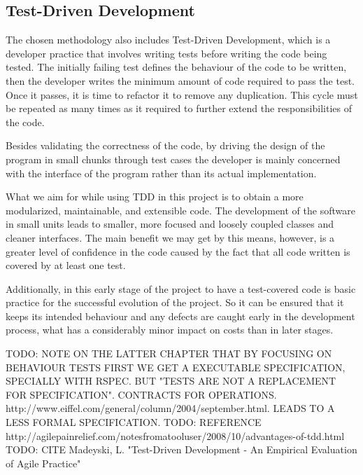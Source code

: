 \subsection{Test-Driven Development}

The chosen methodology also includes Test-Driven Development, which is a developer practice that involves writing tests before writing the code being tested. The initially failing test defines the behaviour of the code to be written, then the developer writes the minimum amount of code required to pass the test. Once it passes, it is time to refactor it to remove any duplication. This cycle must be repeated as many times as it required to further extend the responsibilities of the code.

Besides validating the correctness of the code, by driving the design of the program in small chunks through test cases the developer is mainly concerned with the interface of the program rather than its actual implementation.

What we aim for while using TDD in this project is to obtain a more modularized, maintainable, and extensible code. The development of the software in small units leads to smaller, more focused and loosely coupled classes and cleaner interfaces. The main benefit we may get by this means, however, is a greater level of confidence in the code caused by the fact that all code written is covered by at least one test.

Additionally, in this early stage of the project to have a test-covered code is basic practice for the successful evolution of the project. So it can be ensured that it keeps its intended behaviour and any defects are caught early in the development process, what has a considerably minor impact on costs than in later stages.

TODO: NOTE ON THE LATTER CHAPTER THAT BY FOCUSING ON BEHAVIOUR TESTS FIRST WE GET A EXECUTABLE SPECIFICATION, SPECIALLY WITH RSPEC. BUT "TESTS ARE NOT A REPLACEMENT FOR SPECIFICATION". CONTRACTS FOR OPERATIONS. http://www.eiffel.com/general/column/2004/september.html. LEADS TO A LESS FORMAL SPECIFICATION.
TODO: REFERENCE http://agilepainrelief.com/notesfromatooluser/2008/10/advantages-of-tdd.html
TODO: CITE Madeyski, L. "Test-Driven Development - An Empirical Evaluation of Agile Practice"
